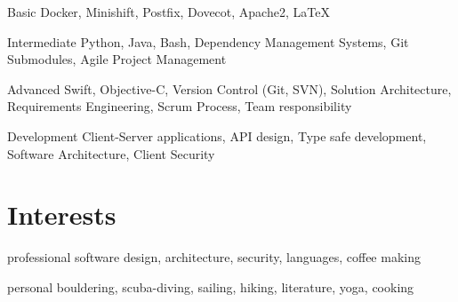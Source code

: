 \documentclass[]{friggeri-cv} %
\begin{document}
\begin{entrylist}

	
	\smallentry
	{Basic}
	{Docker, Minishift, Postfix, Dovecot, Apache2, LaTeX}
	
	
	\smallentry
	{Intermediate}
	{Python, Java, Bash, Dependency Management Systems, Git Submodules, Agile Project Management}
	
	
	\smallentry
	{Advanced}
	{Swift, Objective-C, Version Control (Git, SVN), Solution Architecture, Requirements Engineering, Scrum Process, Team responsibility}
	
	
	\smallentry
	{Development}
	{Client-Server applications, API design, Type safe development, Software Architecture, Client Security}


\end{entrylist}


\section{Interests}

\begin{entrylist}
	\smallentry
	{professional}
	{software design, architecture, security, languages, coffee making}

	\smallentry
	{personal}
	{bouldering, scuba-diving, sailing, hiking, literature, yoga, cooking}
	
\end{entrylist}



\end{document}
